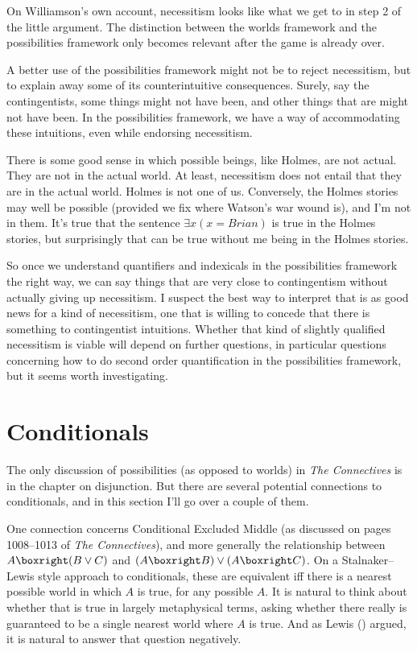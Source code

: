 \documentclass[
  11pt,
  letterpaper,
  DIV=11,
  numbers=noendperiod,
  twoside]{scrartcl}
\begin{document}
On Williamson's own account, necessitism looks like what we get to in
step 2 of the little argument. The distinction between the worlds
framework and the possibilities framework only becomes relevant after
the game is already over.

A better use of the possibilities framework might not be to reject
necessitism, but to explain away some of its counterintuitive
consequences. Surely, say the contingentists, some things might not have
been, and other things that are might not have been. In the
possibilities framework, we have a way of accommodating these
intuitions, even while endorsing necessitism.

There is some good sense in which possible beings, like Holmes, are not
actual. They are not in the actual world. At least, necessitism does not
entail that they are in the actual world. Holmes is not one of us.
Conversely, the Holmes stories may well be possible (provided we fix
where Watson's war wound is), and I'm not in them. It's true that the
sentence \(\exists x (x = \textit{Brian})\) is true in the Holmes
stories, but surprisingly that can be true without me being in the
Holmes stories.

So once we understand quantifiers and indexicals in the possibilities
framework the right way, we can say things that are very close to
contingentism without actually giving up necessitism. I suspect the best
way to interpret that is as good news for a kind of necessitism, one
that is willing to concede that there is something to contingentist
intuitions. Whether that kind of slightly qualified necessitism is
viable will depend on further questions, in particular questions
concerning how to do second order quantification in the possibilities
framework, but it seems worth investigating.

\section{Conditionals}\label{sec-conditionals}

The only discussion of possibilities (as opposed to worlds) in \emph{The
Connectives} is in the chapter on disjunction. But there are several
potential connections to conditionals, and in this section I'll go over
a couple of them.

One connection concerns Conditional Excluded Middle (as discussed on
pages 1008--1013 of \emph{The Connectives}), and more generally the
relationship between \(A \boxright (B \vee C)\) and
\((A \boxright B) \vee (A \boxright C)\). On a Stalnaker--Lewis style
approach to conditionals, these are equivalent iff there is a nearest
possible world in which \(A\) is true, for any possible \(A\). It is
natural to think about whether that is true in largely metaphysical
terms, asking whether there really is guaranteed to be a single nearest
world where \(A\) is true. And as Lewis
() argued, it is natural to answer that
question negatively.
\end{document}
